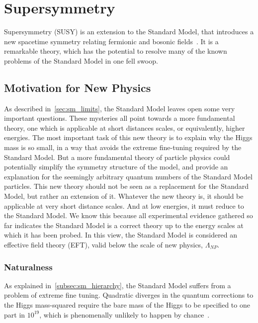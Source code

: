 \chapter{Supersymmetry} \label{ch:susy}

Supersymmetry (SUSY) is an extension to the Standard Model, that introduces a new spacetime symmetry relating fermionic and bosonic fields~\cite{sm-pdg-dark-matter}.
It is a remarkable theory, which has the potential to resolve many of the known problems of the Standard Model in one fell swoop.

\section{Motivation for New Physics}\label{sec:susy_motivation}

As described in~\ref{sec:sm_limits}, the Standard Model leaves open some very important questions.
These mysteries all point towards a more fundamental theory, one which is applicable at short distances scales,
or equivalently, higher energies.
The most important task of this new theory is to explain why the Higgs mass is so small,
in a way that avoids the extreme fine-tuning required by the Standard Model.
But a more fundamental theory of particle physics could potentially simplify the symmetry structure of the model,
and provide an explanation for the seemingly arbitrary quantum numbers of the Standard Model particles.
This new theory should not be seen as a replacement for the Standard Model, but rather an extension of it.
Whatever the new theory is, it should be applicable at very short distance scales.
And at low energies, it must reduce to the Standard Model.
We know this because all experimental evidence gathered so far indicates the Standard Model is a correct theory
up to the energy scales at which it has been probed.
In this view, the Standard Model is considered an effective field theory (EFT),
valid below the scale of new physics, $\Lambda_{NP}$.

\subsection{Naturalness}\label{subsec:susy_naturalness}

As explained in~\ref{subsec:sm_hierarchy}, the Standard Model suffers from a problem of extreme fine tuning.
Quadratic diverges in the quantum corrections to the Higgs mass-squared require the bare mass of the Higgs to be
specified to one part in $10^{19}$, which is phenomenally unlikely to happen by chance~\cite{susy-higgs-fine-tuning}.

